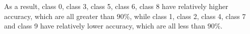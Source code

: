 \documentclass[conference]{IEEEtran}
\begin{document}
	
	As a result, class 0, class 3, class 5, class 6, class 8 have relatively higher accuracy, which are all greater than $90\%$, while class 1, class 2, class 4, class 7 and class 9 have relatively lower accuracy, which are all less than $90\%$.
	
	\begin{figure}[t]
		\centering  %
		\subfigure[Class 6]{
			\label{Fig.ROC6}
}
\end{figure}
\end{document}
